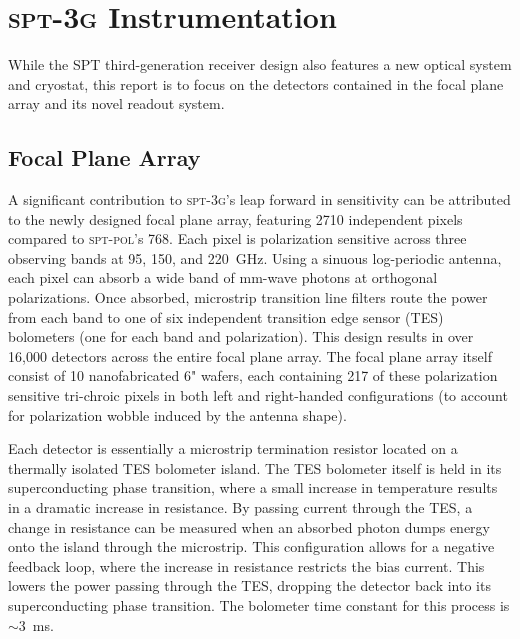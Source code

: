 \documentclass[iop]{emulateapj}
\begin{document}
\section{\textsc{spt-3g} Instrumentation}
\label{instrumentation_section}

While the SPT third-generation receiver design also features a new optical system and cryostat, this report is to focus on the detectors contained in the focal plane array and its novel readout system.

\subsection{Focal Plane Array}

A significant contribution to \textsc{spt-3g}'s leap forward in sensitivity can be attributed to the newly designed focal plane array, featuring 2710 independent pixels compared to \textsc{spt-pol}'s 768.  Each pixel is polarization sensitive across three observing bands at 95, 150, and 220~GHz.  Using a sinuous log-periodic antenna, each pixel can absorb a wide band of mm-wave photons at orthogonal polarizations.  Once absorbed, microstrip transition line filters route the power from each band to one of six independent transition edge sensor (TES) bolometers (one for each band and polarization).   This design results in over 16,000 detectors across the entire focal plane array.  The focal plane array itself consist of 10 nanofabricated 6" wafers, each containing 217 of these polarization sensitive tri-chroic pixels in both left and right-handed configurations (to account for polarization wobble induced by the antenna shape).

Each detector is essentially a microstrip termination resistor located on a thermally isolated TES bolometer island.  The TES bolometer itself is held in its superconducting phase transition, where a small increase in temperature results in a dramatic increase in resistance.  By passing current through the TES, a change in resistance can be measured when an absorbed photon dumps energy onto the island through the microstrip.  This configuration allows for a negative feedback loop, where the increase in resistance restricts the bias current.  This lowers the power passing through the TES, dropping the detector back into its superconducting phase transition.  The bolometer time constant for this process is $\sim$3~ms.

\end{document}

